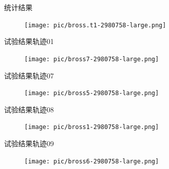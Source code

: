 \documentclass{beamer} %
\begin{document}
\begin{frame}{统计结果}
    \begin{figure}[htbp]
        \centering
        \texttt{[image: pic/bross.t1-2980758-large.png]}
    \end{figure}
\end{frame}

\begin{frame}{试验结果轨迹01}
    \begin{figure}[htbp]
        \centering
        \texttt{[image: pic/bross7-2980758-large.png]}
    \end{figure}
\end{frame}

\begin{frame}{试验结果轨迹07}
    \begin{figure}[htbp]
        \centering
        \texttt{[image: pic/bross5-2980758-large.png]}
    \end{figure}
\end{frame}

\begin{frame}{试验结果轨迹08}
    \begin{figure}[htbp]
        \centering
        \texttt{[image: pic/bross1-2980758-large.png]}
    \end{figure}
\end{frame}

\begin{frame}{试验结果轨迹09}
    \begin{figure}[htbp]
        \centering
        \texttt{[image: pic/bross6-2980758-large.png]}
    \end{figure}
\end{frame}
\end{document}
